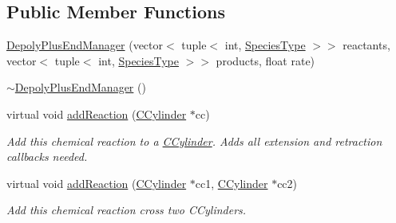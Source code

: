 \subsection*{Public Member Functions}
\begin{DoxyCompactItemize}
\item 
\hyperlink{classDepolyPlusEndManager_a928aca04c94403f31b60431c8b996847}{Depoly\+Plus\+End\+Manager} (vector$<$ tuple$<$ int, \hyperlink{Species_8h_a50651af47c56ea0e27235468d23542cf}{Species\+Type} $>$$>$ reactants, vector$<$ tuple$<$ int, \hyperlink{Species_8h_a50651af47c56ea0e27235468d23542cf}{Species\+Type} $>$$>$ products, float rate)
\item 
\hyperlink{classDepolyPlusEndManager_a262e63ed92a58c78205ac05b2b8fd1bf}{$\sim$\+Depoly\+Plus\+End\+Manager} ()
\item 
virtual void \hyperlink{classDepolyPlusEndManager_a2382f480f2ef9758533cd20cc0cfd0e5}{add\+Reaction} (\hyperlink{classCCylinder}{C\+Cylinder} $\ast$cc)
\begin{DoxyCompactList}\small\item\em Add this chemical reaction to a \hyperlink{classCCylinder}{C\+Cylinder}. Adds all extension and retraction callbacks needed. \end{DoxyCompactList}\item 
virtual void \hyperlink{classDepolyPlusEndManager_af3f3348ebf1d614dc9b1fcfe8282201f}{add\+Reaction} (\hyperlink{classCCylinder}{C\+Cylinder} $\ast$cc1, \hyperlink{classCCylinder}{C\+Cylinder} $\ast$cc2)
\begin{DoxyCompactList}\small\item\em Add this chemical reaction cross two C\+Cylinders. \end{DoxyCompactList}\end{DoxyCompactItemize}
